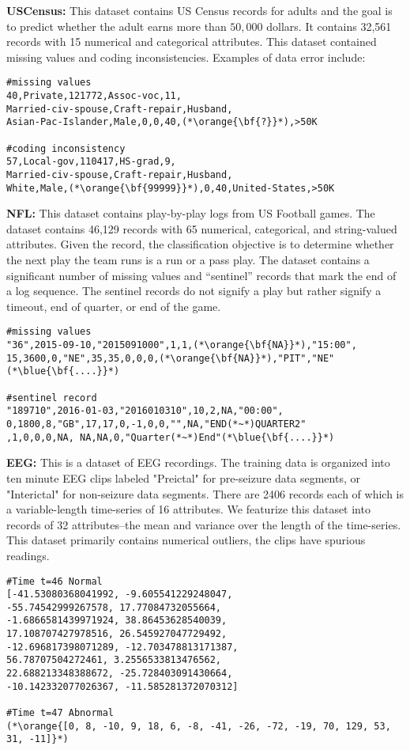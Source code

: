 
\vspace{0.5em}\noindent\textbf{USCensus: } This dataset contains US Census records for adults and the goal is to predict  whether the adult earns more than $50,000$ dollars. It contains 32,561 records with 15 numerical and categorical attributes. This dataset contained missing values and coding inconsistencies.
Examples of data error include:
\begin{lstlisting}
#missing values
40,Private,121772,Assoc-voc,11,
Married-civ-spouse,Craft-repair,Husband, 
Asian-Pac-Islander,Male,0,0,40,(*\orange{\bf{?}}*),>50K

#coding inconsistency
57,Local-gov,110417,HS-grad,9,
Married-civ-spouse,Craft-repair,Husband,
White,Male,(*\orange{\bf{99999}}*),0,40,United-States,>50K
\end{lstlisting}


\vspace{0.5em}\noindent\textbf{NFL: } This dataset contains play-by-play logs from US Football games. The dataset contains 46,129 records with 65 numerical, categorical, and string-valued attributes. Given the record, the classification objective is to determine whether the next play the team runs is a run or a pass play.
The dataset contains a significant number of missing values and ``sentinel'' records that mark the end of a log sequence. The sentinel records do not signify a play but rather signify a timeout, end of quarter, or end of the game.
\begin{lstlisting}
#missing values
"36",2015-09-10,"2015091000",1,1,(*\orange{\bf{NA}}*),"15:00",
15,3600,0,"NE",35,35,0,0,0,(*\orange{\bf{NA}}*),"PIT","NE"(*\blue{\bf{....}}*)

#sentinel record
"189710",2016-01-03,"2016010310",10,2,NA,"00:00",
0,1800,8,"GB",17,17,0,-1,0,0,"",NA,"END(*~*)QUARTER2"
,1,0,0,0,NA, NA,NA,0,"Quarter(*~*)End"(*\blue{\bf{....}}*)
\end{lstlisting}


\vspace{0.5em}\noindent\textbf{EEG: } This is a dataset of EEG recordings. 
The training data is organized into ten minute EEG clips labeled "Preictal" for pre-seizure data segments, or "Interictal" for non-seizure data segments. 
There are 2406 records each of which is a variable-length time-series of 16 attributes. We featurize this dataset into records of 32 attributes--the mean and variance over the length of the time-series. 
This dataset primarily contains numerical outliers, the clips have spurious readings.
\begin{lstlisting}
#Time t=46 Normal
[-41.53080368041992, -9.605541229248047, 
-55.74542999267578, 17.77084732055664,
-1.6866581439971924, 38.86453628540039, 
17.108707427978516, 26.545927047729492, 
-12.696817398071289, -12.703478813171387, 
56.78707504272461, 3.2556533813476562, 
22.688213348388672, -25.728403091430664, 
-10.142332077026367, -11.585281372070312]

#Time t=47 Abnormal
(*\orange{[0, 8, -10, 9, 18, 6, -8, -41, -26, -72, -19, 70, 129, 53, 31, -11]}*)
\end{lstlisting}

